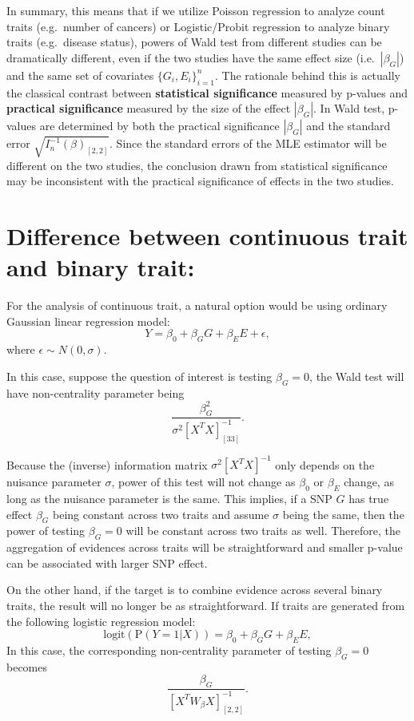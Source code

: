 \documentclass[
]{article}
\begin{document}
In summary, this means that if we utilize Poisson regression to analyze
count traits (e.g.~number of cancers) or Logistic/Probit regression to
analyze binary traits (e.g.~disease status), powers of Wald test from
different studies can be dramatically different, even if the two studies
have the same effect size (i.e.~\(|\beta_G|\)) and the same set of
covariates \(\{G_{i},E_{i}\}_{i=1}^n\). The rationale behind this is
actually the classical contrast between
\textbf{statistical significance} measured by p-values and
\textbf{practical significance} measured by the size of the effect
\(|\beta_G|\). In Wald test, p-values are determined by both the
practical significance \(|\beta_G|\) and the standard error
\(\sqrt{I_n^{-1}(\beta)_{[2,2]}}\). Since the standard errors of the MLE
estimator will be different on the two studies, the conclusion drawn
from statistical significance may be inconsistent with the practical
significance of effects in the two studies.

\hypertarget{difference-between-continuous-trait-and-binary-trait}{%
\section{Difference between continuous trait and binary
trait:}\label{difference-between-continuous-trait-and-binary-trait}}

For the analysis of continuous trait, a natural option would be using
ordinary Gaussian linear regression model:
\[Y = \beta_0 + \beta_G G + \beta_E E+\epsilon,\] where
\(\epsilon \sim N(0,\sigma)\).

In this case, suppose the question of interest is testing \(\beta_G=0\),
the Wald test will have non-centrality parameter being
\[\frac{\beta_G^2}{\sigma^2[X^TX]^{-1}_{[33]}}.\]

Because the (inverse) information matrix \(\sigma^2[X^TX]^{-1}\) only
depends on the nuisance parameter \(\sigma\), power of this test will
not change as \(\beta_0\) or \(\beta_E\) change, as long as the nuisance
parameter is the same. This implies, if a SNP \(G\) has true effect
\(\beta_G\) being constant across two traits and assume \(\sigma\) being
the same, then the power of testing \(\beta_G = 0\) will be constant
across two traits as well. Therefore, the aggregation of evidences
across traits will be straightforward and smaller p-value can be
associated with larger SNP effect.

On the other hand, if the target is to combine evidence across several
binary traits, the result will no longer be as straightforward. If
traits are generated from the following logistic regression model:
\[\text{logit}(\text{P}(Y=1|X)) = \beta_0 + \beta_G G + \beta_E E,\] In
this case, the corresponding non-centrality parameter of testing
\(\beta_G=0\) becomes \[\frac{\beta_G}{[X^TW_\beta X]^{-1}_{[2,2]}}.\]
\end{document}
